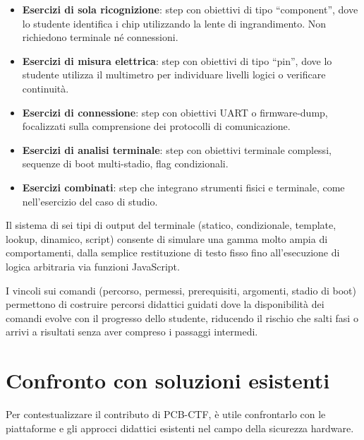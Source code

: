 \begin{itemize}
    \item \textbf{Esercizi di sola ricognizione}: step con obiettivi di tipo ``component'', dove lo studente identifica i chip utilizzando la lente di ingrandimento. Non richiedono terminale né connessioni.
    \item \textbf{Esercizi di misura elettrica}: step con obiettivi di tipo ``pin'', dove lo studente utilizza il multimetro per individuare livelli logici o verificare continuità.
    \item \textbf{Esercizi di connessione}: step con obiettivi UART o firmware-dump, focalizzati sulla comprensione dei protocolli di comunicazione.
    \item \textbf{Esercizi di analisi terminale}: step con obiettivi terminale complessi, sequenze di boot multi-stadio, flag condizionali.
    \item \textbf{Esercizi combinati}: step che integrano strumenti fisici e terminale, come nell'esercizio del caso di studio.
\end{itemize}

Il sistema di sei tipi di output del terminale (statico, condizionale, template, lookup, dinamico, script) consente di simulare una gamma molto ampia di comportamenti, dalla semplice restituzione di testo fisso fino all'esecuzione di logica arbitraria via funzioni JavaScript.

I vincoli sui comandi (percorso, permessi, prerequisiti, argomenti, stadio di boot) permettono di costruire percorsi didattici guidati dove la disponibilità dei comandi evolve con il progresso dello studente, riducendo il rischio che salti fasi o arrivi a risultati senza aver compreso i passaggi intermedi.


\section{Confronto con soluzioni esistenti}
\label{sec:confronto}

Per contestualizzare il contributo di PCB-CTF, è utile confrontarlo con le piattaforme e gli approcci didattici esistenti nel campo della sicurezza hardware.

